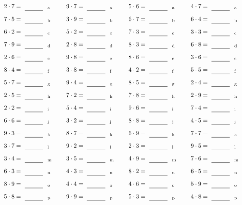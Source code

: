 \documentclass
[
  draft    = true,
  fontsize = 11pt,
  parskip  = half-
]
{scrartcl}
\begin{document}
\par\vfill\par
\begin{align*}
    \pline{2\cdot7}&=\rline{a}
  & \pline{9\cdot7}&=\rline{a}
  & \pline{5\cdot6}&=\rline{a}
  & \pline{4\cdot7}&=\rline{a} \\[1ex]
    \pline{7\cdot5}&=\rline{b}
  & \pline{3\cdot9}&=\rline{b}
  & \pline{6\cdot7}&=\rline{b}
  & \pline{6\cdot4}&=\rline{b} \\[1ex]
    \pline{6\cdot2}&=\rline{c}
  & \pline{5\cdot2}&=\rline{c}
  & \pline{7\cdot3}&=\rline{c}
  & \pline{3\cdot3}&=\rline{c} \\[1ex]
    \pline{7\cdot9}&=\rline{d}
  & \pline{2\cdot8}&=\rline{d}
  & \pline{8\cdot3}&=\rline{d}
  & \pline{6\cdot8}&=\rline{d} \\[1ex]
    \pline{2\cdot6}&=\rline{e}
  & \pline{9\cdot8}&=\rline{e}
  & \pline{8\cdot6}&=\rline{e}
  & \pline{3\cdot6}&=\rline{e} \\[1ex]
    \pline{8\cdot4}&=\rline{f}
  & \pline{3\cdot8}&=\rline{f}
  & \pline{4\cdot2}&=\rline{f}
  & \pline{5\cdot5}&=\rline{f} \\[1ex]
    \pline{5\cdot7}&=\rline{g}
  & \pline{9\cdot4}&=\rline{g}
  & \pline{8\cdot5}&=\rline{g}
  & \pline{2\cdot4}&=\rline{g} \\[1ex]
    \pline{2\cdot5}&=\rline{h}
  & \pline{7\cdot2}&=\rline{h}
  & \pline{7\cdot8}&=\rline{h}
  & \pline{2\cdot9}&=\rline{h} \\[1ex]
    \pline{2\cdot2}&=\rline{i}
  & \pline{5\cdot4}&=\rline{i}
  & \pline{9\cdot6}&=\rline{i}
  & \pline{7\cdot4}&=\rline{i} \\[1ex]
    \pline{6\cdot6}&=\rline{j}
  & \pline{3\cdot2}&=\rline{j}
  & \pline{8\cdot8}&=\rline{j}
  & \pline{4\cdot5}&=\rline{j} \\[1ex]
    \pline{9\cdot3}&=\rline{k}
  & \pline{8\cdot7}&=\rline{k}
  & \pline{6\cdot9}&=\rline{k}
  & \pline{7\cdot7}&=\rline{k} \\[1ex]
    \pline{3\cdot7}&=\rline{l}
  & \pline{9\cdot2}&=\rline{l}
  & \pline{2\cdot3}&=\rline{l}
  & \pline{9\cdot5}&=\rline{l} \\[1ex]
    \pline{3\cdot4}&=\rline{m}
  & \pline{3\cdot5}&=\rline{m}
  & \pline{4\cdot9}&=\rline{m}
  & \pline{7\cdot6}&=\rline{m} \\[1ex]
    \pline{6\cdot3}&=\rline{n}
  & \pline{4\cdot3}&=\rline{n}
  & \pline{8\cdot2}&=\rline{n}
  & \pline{6\cdot5}&=\rline{n} \\[1ex]
    \pline{8\cdot9}&=\rline{o}
  & \pline{4\cdot4}&=\rline{o}
  & \pline{4\cdot6}&=\rline{o}
  & \pline{5\cdot9}&=\rline{o} \\[1ex]
    \pline{5\cdot8}&=\rline{p}
  & \pline{9\cdot9}&=\rline{p}
  & \pline{5\cdot3}&=\rline{p}
  & \pline{4\cdot8}&=\rline{p}
\end{align*}
\end{document}
